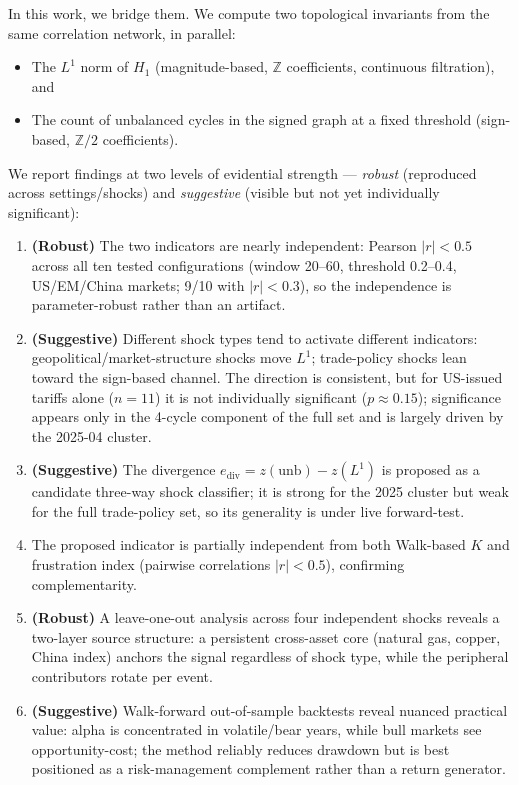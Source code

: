 \documentclass[11pt]{article}
\begin{document}
In this work, we bridge them. We compute two topological invariants from the
same correlation network, in parallel:
\begin{itemize}
  \item The $L^1$ norm of $H_1$ (magnitude-based, $\mathbb{Z}$ coefficients,
        continuous filtration), and
  \item The count of unbalanced cycles in the signed graph at a fixed threshold
        (sign-based, $\mathbb{Z}/2$ coefficients).
\end{itemize}
We report findings at two levels of evidential strength --- \emph{robust}
(reproduced across settings/shocks) and \emph{suggestive} (visible but not yet
individually significant):
\begin{enumerate}
  \item \textbf{(Robust)} The two indicators are nearly independent: Pearson
        $|r| < 0.5$ across all ten tested configurations (window 20--60,
        threshold 0.2--0.4, US/EM/China markets; 9/10 with $|r| < 0.3$),
        so the independence is parameter-robust rather than an artifact.
  \item \textbf{(Suggestive)} Different shock types tend to activate different
        indicators: geopolitical/market-structure shocks move $L^1$;
        trade-policy shocks lean toward the sign-based channel. The direction is
        consistent, but for US-issued tariffs alone ($n=11$) it is not
        individually significant ($p \approx 0.15$); significance appears only in
        the 4-cycle component of the full set and is largely driven by the
        2025-04 cluster.
  \item \textbf{(Suggestive)} The divergence $e_{\mathrm{div}} = z(\text{unb}) -
        z(L^1)$ is proposed as a candidate three-way shock classifier; it is
        strong for the 2025 cluster but weak for the full trade-policy set, so
        its generality is under live forward-test.
  \item The proposed indicator is partially independent from both Walk-based
        $K$ \cite{ferreira2021loss} and frustration index
        \cite{aref2018frustration} (pairwise correlations $|r| < 0.5$),
        confirming complementarity.
  \item \textbf{(Robust)} A leave-one-out analysis across four independent shocks
        reveals a two-layer source structure: a persistent cross-asset core
        (natural gas, copper, China index) anchors the signal regardless of shock
        type, while the peripheral contributors rotate per event.
  \item \textbf{(Suggestive)} Walk-forward out-of-sample backtests reveal nuanced
        practical value: alpha is concentrated in volatile/bear years, while bull
        markets see opportunity-cost; the method reliably reduces drawdown but
        is best positioned as a risk-management complement rather than a
        return generator.
\end{enumerate}
\end{document}
